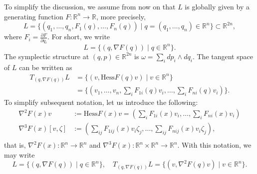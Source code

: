 \documentclass[12pt]{article}
\newtheorem{definition}[lemma]{Definition}
\newcommand{\R}{{\mathbb R}}
\begin{document}
To simplify the discussion, we assume from now on that $L$ is globally given by a generating function $F:\R^n\to\R$, more precisely, 
\begin{equation}\nonumber
L=\big\{(q_1,\ldots,q_n, F_1(q),\ldots,  F_n(q))\mid q=(q_1,\ldots,q_n)\in\R^n\big\}\subset\R^{2n},
\end{equation}
where $F_i=\frac{\partial F}{\partial q_i}$. For short, we write 
$$
L=\{(q,\nabla F(q))\mid q\in \R^n\}.
$$
The symplectic structure at $(q,p)\in \R^{2n}$ is $\omega=\sum_idp_i\wedge dq_i$.
The tangent space of $L$ can be written as
\begin{equation}\nonumber
\begin{aligned}
T_{(q,\nabla F(q))}L&=\{(v,\mathrm{Hess}F(q)v)\mid v\in\R^n\}\\
&=\{(v_1,\ldots,v_n,\sum_iF_{1i}(q)v_i,\ldots,\sum_iF_{ni}(q)v_i)\}.
\end{aligned}
\end{equation}
To simplify subsequent notation, let us introduce the following:
\begin{equation}\nonumber
\begin{aligned}
\nabla^2F(x)v&:=\mathrm{Hess}F(x)v=\left(\sum_iF_{1i}(x)v_i,\ldots,\sum_iF_{ni}(x)v_i\right)\\
\nabla^3F(x)[v,\zeta]&:=\left(\sum_{ij}F_{1ij}(x)v_i\zeta_j,\ldots,\sum_{ij}F_{nij}(x)v_i\zeta_j\right),\\
\end{aligned}
\end{equation}
that is, $\nabla^2F(x):\R^n\to\R^n$ and $\nabla^3F(x):\R^n\times\R^n\to\R^n$. With this notation, we may write
\begin{equation}\nonumber
L=\{(q,\nabla F(q))\mid q\in \R^n\},\quad T_{(q,\nabla F(q))}L=\{(v,\nabla^2F(q)v)\mid v\in\R^n\}.
\end{equation}
%
\end{document}
